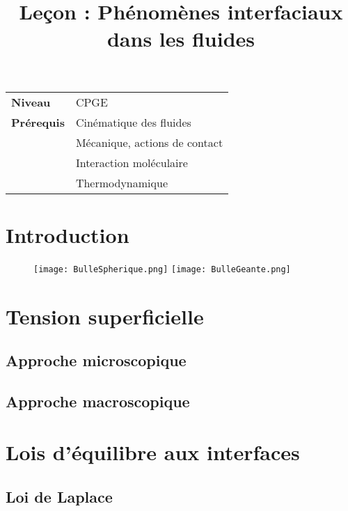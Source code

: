 \documentclass[10pt]{beamer}
\title{Leçon : Phénomènes interfaciaux dans les fluides}
\begin{document}
\begin{frame}{}
    \titlepage

    \begin{tabularx}{\textwidth}{l@{:\,\,}X}
        \textbf{Niveau} 	  & CPGE\\
        \textbf{Prérequis} & Cinématique des fluides\\
        & 			Mécanique, actions de contact \\
        &   Interaction moléculaire \\
        & Thermodynamique
    \end{tabularx}
\end{frame}

\begin{frame}
    \tableofcontents
\end{frame}

\section{Introduction}
\begin{frame}{\insertsection}
    \begin{figure}
    \centering
    \texttt{[image: BulleSpherique.png]}
    \texttt{[image: BulleGeante.png]}
\end{figure}
\end{frame}

\section{Tension superficielle}
\subsection{Approche microscopique}
\subsection{Approche macroscopique}
\section{Lois d'équilibre aux interfaces}
\subsection{Loi de Laplace}
\end{document}
